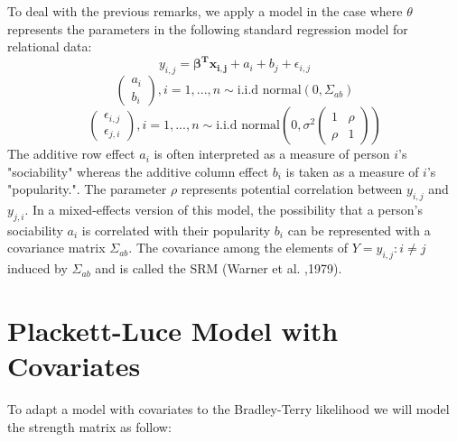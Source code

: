 \documentclass[12pt]{ociamthesis}  %
\begin{document}
	To deal with the previous remarks, we apply a model in the case where $\theta$  represents the parameters in the following standard regression model for relational data:
	\begin{equation}
	y_{i,j} = \boldsymbol{\beta^{T} {x_{i,j}}} + a_{i} + b_{j} + \epsilon_{i,j}
	\end{equation}
	\begin{equation}
	\begin{pmatrix}
	a_{i} \\
	b_{i}
	\end{pmatrix}
	, i = 1,...,n \sim \text{i.i.d normal}(0,\Sigma_{ab})
	\end{equation}
	\begin{equation}
	\begin{pmatrix}
	\epsilon_{i,j} \\
	\epsilon_{j,i}
	\end{pmatrix}
	, i = 1,...,n \sim \text{i.i.d normal}(0,\sigma^{2} \begin{pmatrix} 1 & \rho \\ \rho & 1 \end{pmatrix})
	\end{equation}
	The additive row effect $a_{i}$ is often interpreted as a measure of person $i$’s "sociability" whereas the additive column effect $b_{i}$ is taken as a measure of $i$’s "popularity.". The parameter $\rho$ represents potential correlation between $y_{i,j} $ and $y_{j,i}$. In a mixed-effects version
	of this model, the possibility that a person’s sociability $a_{i}$ is correlated with their popularity $b_{i}$ can be represented with a covariance matrix $\Sigma_{ab}$. The covariance among the elements of $Y = {y_{i,j} : i \neq j}$ induced by $\Sigma_{ab}$ and is called the SRM (Warner et al. ,1979).
	
	\section{Plackett-Luce Model with Covariates}
	
	To adapt a model with covariates to the Bradley-Terry likelihood we will model the strength matrix as follow:
	
\end{document}
